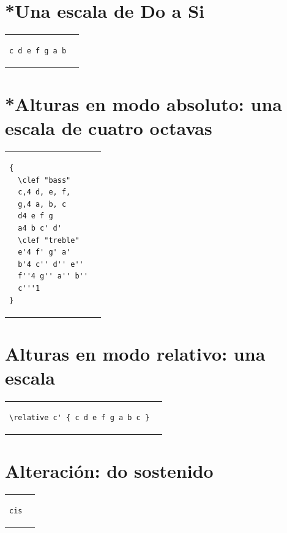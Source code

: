 \documentclass[a4paper,10pt,oneside,headinclude,titlepage]{article} %
\begin{document}
\section*{*Una escala de Do a Si}
\begin{tabular}{m{2cm}m{2cm}}
\begin{verbatim}
c d e f g a b
\end{verbatim}
&
\begin[fragment]{lilypond}
c d e f g a b
\end{lilypond}
\end{tabular}

\section*{*Alturas en modo absoluto: una escala de cuatro octavas}
\begin{tabular}{m{3cm}m{2cm}}
\begin{verbatim}
{
  \clef "bass"
  c,4 d, e, f,
  g,4 a, b, c 
  d4 e f g
  a4 b c' d'
  \clef "treble"
  e'4 f' g' a'
  b'4 c'' d'' e''
  f''4 g'' a'' b''
  c'''1
}
\end{verbatim}
&
\begin[fragment,staffsize=15,line-width=13\cm]{lilypond}
{
  \clef "bass"
  c,4 d, e, f,
  g,4 a, b, c 
  d4 e f g
  a4 b c' d'
  \clef "treble"
  e'4 f' g' a'
  b'4 c'' d'' e''
  f''4 g'' a'' b''
  c'''1
}
\end{lilypond}
\end{tabular}

\section*{Alturas en modo relativo: una escala}
\begin{tabular}{m{6cm}m{2cm}}
\begin{verbatim}
\relative c' { c d e f g a b c }
\end{verbatim}
&
\begin[fragment]{lilypond}
\relative c' { c d e f g a b c }
\end{lilypond}
\end{tabular}

\section*{Alteración: do sostenido}
\begin{tabular}{m{2cm}m{2cm}}
\begin{verbatim}
cis
\end{verbatim}
&
\begin[fragment,relative=2,notime]{lilypond}
cis
\end{lilypond}
\end{tabular}
\end{document}
